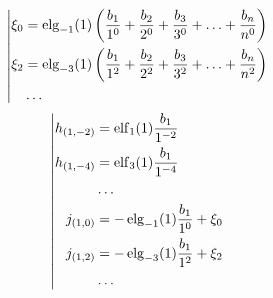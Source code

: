 \begin{equation*} \left| \begin{aligned}
\xi_0 &= \elg_{-1}(1) \left(
  \frac{b_1}{1^0}
+ \frac{b_2}{2^0}
+ \frac{b_3}{3^0}
+ \ldots
+ \frac{b_n}{n^0} \right) \\
%
\xi_2 &= \elg_{-3}(1) \left(
  \frac{b_1}{1^2}
+ \frac{b_2}{2^2}
+ \frac{b_3}{3^2}
+ \ldots
+ \frac{b_n}{n^2} \right) \\
%
&\ldots \\
\end{aligned} \right. \end{equation*}
%
\begin{equation*} \left| \begin{aligned}
%
h_{(1,-2)} &=
  \elf_1(1) \frac{b_1}{1^{-2}} \\
%
h_{(1,-4)} &=
  \elf_3(1) \frac{b_1}{1^{-4}} \\
%
&\ldots \\
%
j_{(1,0)} &=
- \elg_{-1}(1) \frac{b_1}{1^0}
+ \xi_0 \\
%
j_{(1,2)} &=
- \elg_{-3}(1) \frac{b_1}{1^2}
+ \xi_2 \\
%
&\ldots \\
\end{aligned} \right. \end{equation*}

